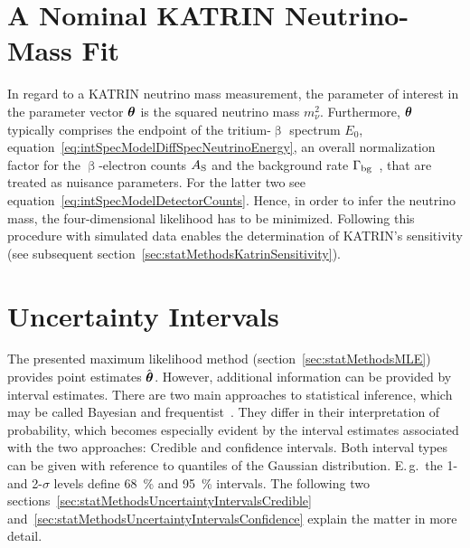 \section{A Nominal KATRIN Neutrino-Mass Fit}
\label{sec:statMethodsStandardFit}
In regard to a KATRIN neutrino mass measurement, the parameter of interest in the parameter vector $\boldsymbol{\mathbf{\theta}}$ is the squared neutrino mass $m_\nu^2$. Furthermore, $\boldsymbol{\mathbf{\theta}}$ typically comprises the endpoint of the tritium-$\upbeta$ spectrum $E_0$, equation~\eqref{eq:intSpecModelDiffSpecNeutrinoEnergy}, an overall normalization factor for the $\upbeta$-electron counts $A_{\mathrm{S}}$ and the background rate $\Gamma_{\mathrm{bg}}$~\cite{Kleesiek2014,Angrik:2005ep}, that are treated as nuisance parameters. For the latter two see equation~\eqref{eq:intSpecModelDetectorCounts}. Hence, in order to infer the neutrino mass, the four-dimensional likelihood has to be minimized. Following this procedure with simulated data enables the determination of KATRIN's sensitivity (see subsequent section~\ref{sec:statMethodsKatrinSensitivity}).

\section{Uncertainty Intervals}
\label{sec:statMethodsUncertaintyIntervals}
The presented maximum likelihood method (section~\ref{sec:statMethodsMLE}) provides point estimates $\hat{\boldsymbol{\mathbf{\theta}}}$. However, additional information can be provided by interval estimates. There are two main approaches to statistical inference, which may be called Bayesian and frequentist~\cite{ReviewOfParticlePhysics}. They differ in their interpretation of probability, which becomes especially evident by the interval estimates associated with the two approaches: Credible and confidence intervals. Both interval types can be given with reference to quantiles of the Gaussian distribution. E.\,g.~the 1- and 2-$\sigma$ levels define \SI{68}{\percent} and \SI{95}{\percent} intervals. The following two sections~\ref{sec:statMethodsUncertaintyIntervalsCredible} and~\ref{sec:statMethodsUncertaintyIntervalsConfidence} explain the matter in more detail.

